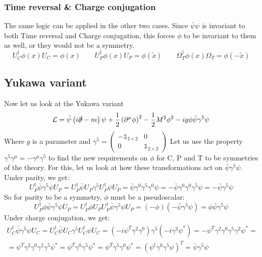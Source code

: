 \documentclass{article}
\begin{document}
\subsubsection{Time reversal \& Charge conjugation}
The same logic can be applied in the other two cases. Since $\bar{\psi}\psi$ is invariant to both Time reversal and Charge conjugation, this forces $\phi$ to be invariant to them as well, or they would not be a symmetry.
\begin{equation}
    U_C^\dagger \phi(x) U_C = \phi(x)
    \qquad
    U_P^\dagger \phi(x) U_P = \phi(\tilde{x})
    \qquad
    \Omega_T^\dagger \phi(x) \Omega_T = \phi(-\tilde{x})
\end{equation}
\subsection{Yukawa variant}
Now let us look at the Yukawa variant
\begin{equation}
    \mathcal{L} = \bar{\psi}\left(i\slashed{\partial} - m\right)\psi +
    \frac{1}{2}\left(\partial^\mu\phi\right)^2 -
    \frac{1}{2}M^2\phi^2 -
    ig\phi\bar{\psi}\gamma^5\psi
\end{equation}
Where $g$ is a parameter and $\gamma^5 = \begin{pmatrix}
    -\mathbb{1}_{2\times2} & 0 \\ 0 & \mathbb{1}_{2\times2}
\end{pmatrix}$
Let us use the property $\gamma^5\gamma^\mu = -\gamma^\mu\gamma^5$ to find the new requirements on $\phi$ for C, P and T to be symmetries of the theory.
For this, let us look at how these transformations act on $\bar{\psi}\gamma^5\psi$.
\newline
Under parity, we get:
\begin{equation}
    U_P^\dagger \bar{\psi}\gamma^5\psi U_P = 
    U_P^\dagger \bar{\psi} U_P \gamma^5 U_P^\dagger \psi U_P = 
    \bar{\psi}\gamma^0\gamma^5\gamma^0\psi = -\bar{\psi}\gamma^0\gamma^0\gamma^5\psi = -\bar{\psi}\gamma^5\psi
\end{equation}
So for parity to be a symmetry, $\phi$ must be a pseudoscalar:
\begin{equation}
    U_P^\dagger \phi \bar{\psi}\gamma^5\psi U_P =
    U_P^\dagger \phi U_P U_P^\dagger \bar{\psi}\gamma^5\psi U_P =
    (-\phi) \left(-\bar{\psi}\gamma^5\psi\right) =
    \phi \bar{\psi}\gamma^5\psi
\end{equation}
Under charge conjugation, we get:
\begin{equation}
\begin{gathered}
    U_C^\dagger \bar{\psi}\gamma^5\psi U_C = 
    U_C^\dagger \bar{\psi} U_C \gamma^5 U_C^\dagger \psi U_C = 
    \left(-i\psi^T\gamma^2\gamma^0\right) \gamma^5 \left(-i\gamma^2\psi^*\right) = 
    - \psi^T\gamma^2\gamma^0\gamma^5\gamma^2\psi^* = \\ =
    \psi^T\gamma^2\gamma^0\gamma^2\gamma^5\psi^* = 
    \psi^T\gamma^0\gamma^5\psi^* =
    \psi^T\gamma^5\gamma^0\psi^* = 
    \left(\psi^\dagger\gamma^0\gamma^5\psi\right)^T =
    \bar{\psi}\gamma^5\psi
\end{gathered}
\end{equation}
\end{document}
